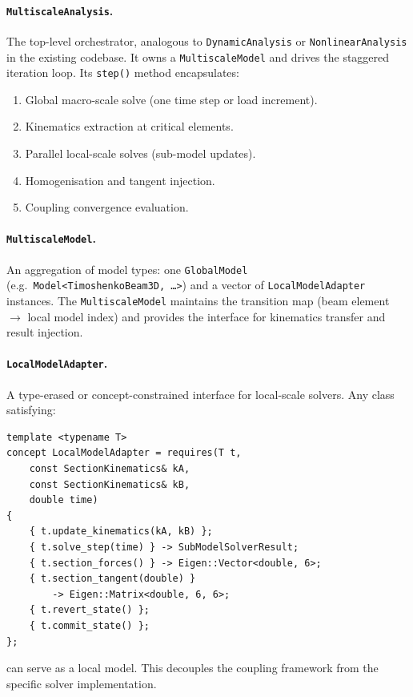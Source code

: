 \paragraph{\texttt{MultiscaleAnalysis}.}
The top-level orchestrator, analogous to \texttt{DynamicAnalysis}
or \texttt{NonlinearAnalysis} in the existing codebase.  It owns
a \texttt{MultiscaleModel} and drives the staggered iteration loop.
Its \texttt{step()} method encapsulates:
\begin{enumerate}
  \item Global macro-scale solve (one time step or load increment).
  \item Kinematics extraction at critical elements.
  \item Parallel local-scale solves (sub-model updates).
  \item Homogenisation and tangent injection.
  \item Coupling convergence evaluation.
\end{enumerate}

\paragraph{\texttt{MultiscaleModel}.}
An aggregation of model types: one \texttt{GlobalModel}
(e.g.\ \texttt{Model<TimoshenkoBeam3D, \ldots>}) and a vector
of \texttt{LocalModelAdapter} instances.  The
\texttt{MultiscaleModel} maintains the transition map
(beam element $\to$ local model index) and provides the interface
for kinematics transfer and result injection.

\paragraph{\texttt{LocalModelAdapter}.}
A type-erased or concept-constrained interface for local-scale
solvers.  Any class satisfying:
\begin{lstlisting}[caption={\texttt{LocalModelAdapter} concept (sketch).}]
template <typename T>
concept LocalModelAdapter = requires(T t,
    const SectionKinematics& kA,
    const SectionKinematics& kB,
    double time)
{
    { t.update_kinematics(kA, kB) };
    { t.solve_step(time) } -> SubModelSolverResult;
    { t.section_forces() } -> Eigen::Vector<double, 6>;
    { t.section_tangent(double) }
        -> Eigen::Matrix<double, 6, 6>;
    { t.revert_state() };
    { t.commit_state() };
};
\end{lstlisting}
can serve as a local model.  This decouples the coupling
framework from the specific solver implementation.

